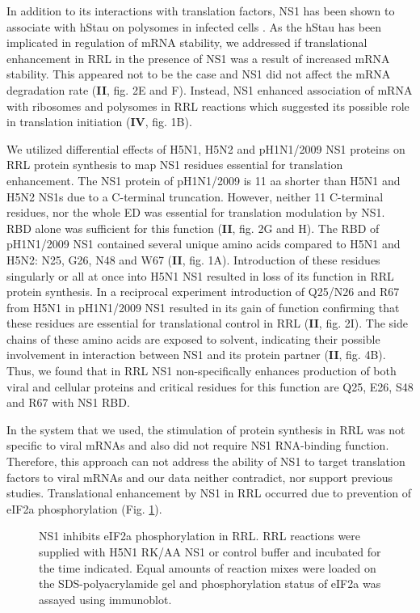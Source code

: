 		In addition to its interactions with translation factors, NS1 has been shown to associate with \gls{hStau} on polysomes in infected cells \parencite{Falcon1999}. As the \gls{hStau} has been implicated in regulation of mRNA stability, we addressed if translational enhancement in \gls{RRL} in the presence of \gls{NS1} was a result of increased mRNA stability. This appeared not to be the case and NS1 did not affect the mRNA degradation rate (\textbf{II}, fig. 2E and F). Instead, NS1 enhanced association of mRNA with ribosomes and polysomes in RRL reactions which suggested its possible role in translation initiation (\textbf{IV}, fig. 1B).
		
		We utilized differential effects of H5N1, H5N2 and pH1N1/2009 NS1 proteins on RRL protein synthesis to map NS1 residues essential for translation enhancement. The NS1 protein of pH1N1/2009 is 11 \gls{aa} shorter than H5N1 and H5N2 \glspl{NS1} due to a C-terminal truncation. However, neither 11 C-terminal residues, nor the whole \gls{ED} was essential for translation modulation by \gls{NS1}. RBD alone was sufficient for this function (\textbf{II}, fig. 2G and H). The RBD of pH1N1/2009 NS1 contained several unique amino acids compared to H5N1 and H5N2: N25, G26, N48 and W67 (\textbf{II}, fig. 1A). Introduction of these residues singularly or all at once into H5N1 NS1 resulted in loss of its function in RRL protein synthesis. In a reciprocal experiment introduction of Q25/N26 and R67 from H5N1 in pH1N1/2009 NS1 resulted in its gain of function confirming that these residues are essential for translational control in RRL (\textbf{II}, fig. 2I). The side chains of these amino acids are exposed to solvent, indicating their possible involvement in interaction between NS1 and its protein partner (\textbf{II}, fig. 4B). Thus, we found that in \gls{RRL} NS1 non-specifically enhances production of both viral and cellular proteins and critical residues for this function are Q25, E26, S48 and R67 with \gls{NS1} \gls{RBD}.
		
		In the system that we used, the stimulation of protein synthesis in \gls{RRL} was not specific to viral mRNAs and also did not require NS1 RNA-binding function. Therefore, this approach can not address the ability of NS1 to target translation factors to viral mRNAs and our data neither contradict, nor support previous studies. Translational enhancement by NS1 in RRL occurred due to prevention of \gls{eIF2a} phosphorylation (Fig. \ref{fig:WB}). 
		
			\begin{figure}[h!]
				\centering
				\caption{NS1 inhibits \gls{eIF2a} phosphorylation in \gls{RRL}. RRL reactions were supplied with H5N1 RK/AA NS1 or control buffer and incubated for the time indicated. Equal amounts of reaction mixes were loaded on the SDS-polyacrylamide gel and phosphorylation status of \gls{eIF2a} was assayed using immunoblot.} \label{fig:WB}
			\end{figure}
		
